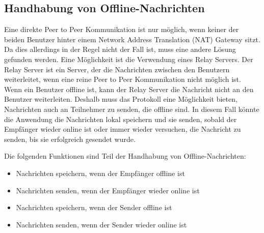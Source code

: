 \subsection{Handhabung von Offline-Nachrichten}

Eine direkte Peer to Peer Kommunikation ist nur möglich, wenn keiner der beiden Benutzer hinter einem 
Network Address Translation (NAT) Gateway sitzt. Da dies allerdings in der Regel nicht der Fall ist,
muss eine andere Lösung gefunden werden. Eine Möglichkeit ist die Verwendung eines Relay Servers.
Der Relay Server ist ein Server, der die Nachrichten zwischen den Benutzern weiterleitet, wenn eine 
reine Peer to Peer Kommunikation nicht möglich ist. Wenn ein Benutzer offline ist, kann der Relay 
Server die Nachricht nicht an den Benutzer weiterleiten.
Deshalb muss das Protokoll eine Möglichkeit bieten, Nachrichten auch an Teilnehmer zu senden, die
offline sind. In diesem Fall könnte die Anwendung die Nachrichten lokal speichern und sie senden, 
sobald der Empfänger wieder online ist oder immer wieder versuchen, die Nachricht zu senden, bis 
sie erfolgreich gesendet wurde.

\noindent Die folgenden Funktionen sind Teil der Handhabung von Offline-Nachrichten:

\begin{itemize}
    \item Nachrichten speichern, wenn der Empfänger offline ist
    \item Nachrichten senden, wenn der Empfänger wieder online ist
    \item Nachrichten speichern, wenn der Sender offline ist
    \item Nachrichten senden, wenn der Sender wieder online ist
\end{itemize}
